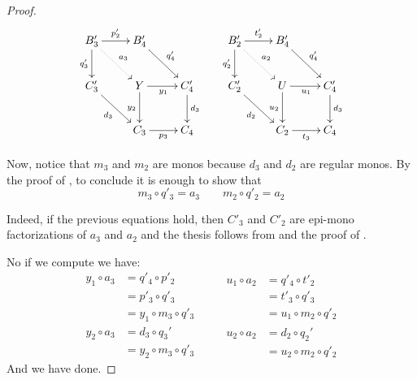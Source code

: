 \begin{proof}
		\[\xymatrix{B'_3 \ar@{.>}[dr]^{a_3} \ar[r]^{p'_2} \ar[d]_{q'_3} &B'_4\ar[dr]^{q'_4}&& B'_2\ar@{.>}[dr]^{a_2} \ar[r]^{t'_2} \ar[d]_{q'_2} &B'_4\ar[dr]^{q'_4}\\C'_3 \ar[dr]_{d_3} &Y \ar[r]_{y_1} \ar[d]_{y_2}& C'_4\ar[d]^{d_3}&C_2' \ar[dr]_{d_2}& U \ar[d]_{u_2}\ar[r]_{u_1}& C'_4 \ar[d]^{d_3}\\&C_3 \ar[r]_{p_3}& C_4 &&C_2 \ar[r]_{t_3}& C_4 }\]

	Now, notice that  $m_3$ and $m_2$ are monos because $d_3$ and $d_2$ are regular monos. By the proof of , to conclude it is enough to show that
	\[m_3\circ q'_3 = a_3 \qquad m_2\circ q'_2=a_2\]

	Indeed, if the previous equations hold, then $C'_3$ and $C'_2$ are epi-mono factorizations of $a_3$ and $a_2$ and the thesis follows from  and the proof of .

	No if we compute we have:
	\[\begin{split}
		y_1\circ a_3&= q'_4\circ p'_2\\&=p'_3 \circ q'_3\\&=y_1\circ m_3\circ q'_3  
	\end{split}\qquad \begin{split}
		u_1\circ a_2&= q'_4\circ t'_2\\&=t'_3 \circ q'_3\\&=u_1\circ m_2\circ q'_2  
	\end{split}\]
	\[\begin{split}
	y_2\circ a_3&= d_3\circ q_3'\\&=y_2\circ m_3\circ q'_3
	\end{split}\qquad \begin{split}
	u_2\circ a_2&= d_2\circ q_2'\\&=u_2\circ m_2\circ q'_2
	\end{split}\]
	And we have done.
\end{proof} 
